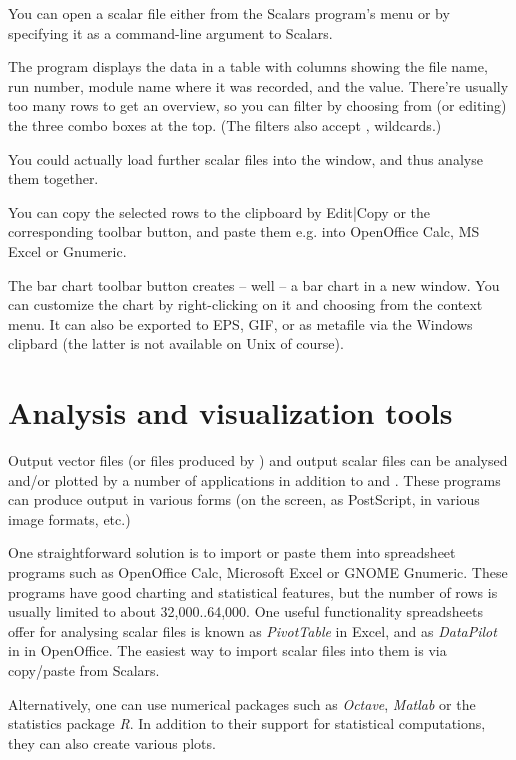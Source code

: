 You can open a scalar file either from the Scalars program's menu
or by specifying it as a command-line argument to Scalars.

The program displays the data in a table with columns showing the
file name, run number, module name where it was recorded, and the value.
There're usually too many rows to get an overview, so you can filter
by choosing from (or editing) the three combo boxes at the top.
(The filters also accept \ttt{*}, \ttt{**} wildcards.)

You could actually load further scalar files into the window,
and thus analyse them together.

You can copy the selected rows to the clipboard by Edit|Copy or
the corresponding toolbar button, and paste them e.g. into
OpenOffice Calc, MS Excel or Gnumeric.

The bar chart toolbar button creates -- well -- a bar chart
in a new window. You can customize the chart by right-clicking
on it and choosing from the context menu. It can also be exported
to EPS, GIF, or as metafile via the Windows clipbard (the latter
is not available on Unix of course).



\section{Analysis and visualization tools}
\label{sec:ana-sim:tools}

Output vector files (or files produced by ) and
output scalar files can be analysed and/or plotted by
a number of applications in addition to  and .
These programs can produce output in various forms (on the screen,
as PostScript, in various image formats, etc.)

One straightforward solution is to import or paste them into spreadsheet
programs such as OpenOffice Calc, Microsoft Excel or GNOME Gnumeric.
These programs have good charting and statistical features, but the number
of rows is usually limited to about 32,000..64,000.
One useful functionality spreadsheets offer for analysing scalar files is
known as \textit{PivotTable} in Excel, and as \textit{DataPilot} in in OpenOffice.
The easiest way to import scalar files into them is via copy/paste
from Scalars.

Alternatively, one can use numerical packages such as \textit{Octave},
\textit{Matlab} or the statistics package \textit{R}.
In addition to their support for statistical computations, they can also
create various plots.

